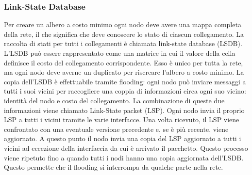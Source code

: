 \documentclass[12pt]{report}
\begin{document}
\subsubsection{Link-State Database}
Per creare un albero a costo minimo ogni nodo deve avere una mappa completa della rete, il che significa che deve conoscere lo stato di ciascun collegamento. La raccolta di stati per tutti i collegamenti è chiamata link-state database (LSDB). L'LSDB può essere rappresentato come una matrice in cui il valore della cella definisce il costo del collegamento corrispondente. Esso è unico per tutta la rete, ma ogni nodo deve averne un duplicato per riscreare l'albero a costo minimo. La copia dell'LSDB è effettuabile tramite flooding: ogni nodo può inviare messaggi a tutti i suoi vicini per raccogliere una coppia di informazioni circa ogni suo vicino: identità del nodo e costo del collegamento. La combinazione di queste due informazioni viene chiamato Link-State packet (LSP). Ogni nodo invia il proprio LSP a tutti i vicini tramite le varie interfacce. Una volta ricevuto, il LSP viene confrontato con una eventuale versione precedente e, se è più recente, viene aggiornato. A questo punto il nodo invia una copia del LSP aggiornato a tutti i vicini ad eccezione della interfaccia da cui è arrivato il pacchetto. Questo processo viene ripetuto fino a quando tutti i nodi hanno una copia aggiornata dell'LSDB. Questo permette che il flooding si interrompa da qualche parte nella rete.
\end{document}
